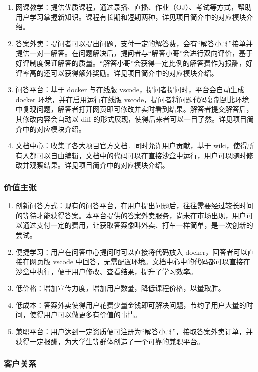 \documentclass[a4paper]{ctexart}
\begin{document}
\begin{enumerate}[label=\alph*.]
  \item 网课教学：提供优质课程，通过录播、直播、作业（OJ）、考试等方式，帮助用户学习掌握新知识。课程有长期和短期两种，详见项目简介中的对应模块介绍。
  \item 答案外卖：提问者可以提出问题，支付一定的解答费，会有“解答小哥”接单并提供一对一解答。在问题解决后，提问者与“解答小哥”会进行双向评价，基于好评制度保证解答的质量。“解答小哥”会获得一定比例的解答费作为报酬，好评率高的还可以获得额外奖励。详见项目简介中的对应模块介绍。
  \item 问答平台：基于 docker 与在线版 vscode，提问者提问时，平台会自动生成 docker 环境，并在启用运行在线版 vscode，提问者将问题代码复制到此环境中复现问题，解答者打开网页即可修改并实时看到结果。解答者提交解答后，其修改内容会自动以 diff 的形式展现，使得后来者可以一目了然。详见项目简介中的对应模块介绍。
  \item 文档中心：收集了各大项目官方文档，同时允许用户贡献，基于 wiki，使得所有人都可以自由编辑，文档中的代码可以在直接沙盒中运行，用户可以随时修改并观察结果。详见项目简介中的对应模块介绍。
\end{enumerate}

\subsubsection{价值主张}

\begin{enumerate}[label=\alph*.]
  \item 创新问答方式：现有的问答平台，在用户提出问题后，往往需要经过较长时间的等待才能获得答案。本平台提供的答案外卖服务，尚未在市场出现，用户可以通过支付一定的费用，让获取答案像叫外卖、打车一样简单，是一次创新的尝试。
  \item 便捷学习：用户在问答中心提问时可以直接将代码放入 docker，回答者可以直接在网页版 vscode 中回答，无需配置环境。文档中心中的代码都可以直接在沙盒中执行，便于用户修改、查看结果，提升了学习效率。
  \item 低价格：增加宣传力度，增加用户数量，降低课程价格，以量取胜。
  \item 低成本：答案外卖使得用户花费少量金钱即可解决问题，节约了用户大量的时间，使得用户可以做更多有价值的事情。
  \item 兼职平台：用户达到一定资质便可注册为“解答小哥”，接取答案外卖订单，并获得一定报酬，为大学生等群体创造了一个可靠的兼职平台。
\end{enumerate}

\subsubsection{客户关系}
\end{document}
